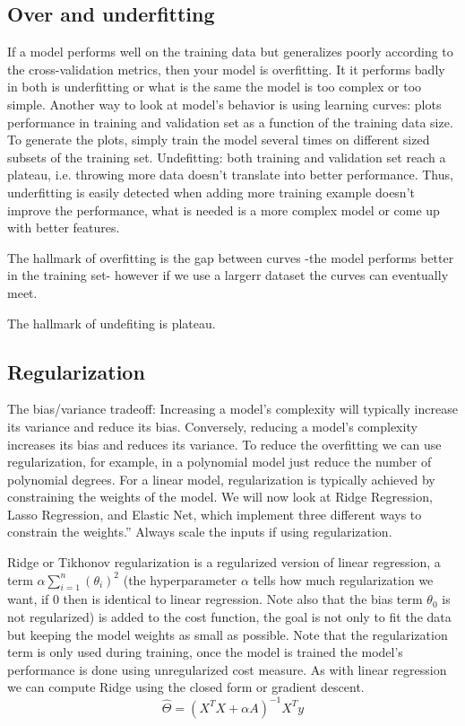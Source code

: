 \documentclass[11pt]{article}
\begin{document}
\subsection{Over and underfitting}
If a model performs well on the training data but generalizes poorly according to the cross-validation metrics, then your model is overfitting. It it performs badly in both is underfitting or what is the same the model is too complex or too simple. Another way to look at model's behavior is using learning curves: plots performance in training and validation set as a function of the training data size. To generate the plots, simply train the model several times on different sized subsets of the training set.
Undefitting: both training and validation set reach a plateau, i.e. throwing more data doesn't translate into better performance.
Thus, underfitting is easily detected when adding more training example doesn't improve the performance, what is needed is a more complex model or come up with better features.

The hallmark of overfitting is the gap between curves -the model performs better in the training set- however if we use a largerr dataset the curves can eventually meet.

The hallmark of undefiting is plateau.


\subsection{Regularization}
The bias/variance tradeoff: Increasing a model’s complexity will typically increase its variance and reduce its bias. Conversely, reducing a model’s complexity increases its bias and reduces its variance. To reduce the overfitting we can use regularization, for example, in a polynomial model just reduce the number of polynomial degrees.
For a linear model, regularization is typically achieved by constraining the weights of the model. We will now look at Ridge Regression, Lasso Regression, and Elastic Net, which implement three different ways to constrain the weights.”
Always scale the inputs if using regularization.


Ridge or Tikhonov regularization is a regularized version of linear regression, a term $\alpha \sum_{i=1}^{n}(\theta_i)^2$ (the hyperparameter $\alpha$ tells how much regularization we want, if 0 then is identical to linear regression. Note also that the bias term $\theta_0$ is not regularized) is added to the cost function, the goal is not only to fit the data but keeping the model weights as small as possible. Note that the regularization term is only used during training, once the model is trained the model's performance is done using unregularized cost measure.
As with linear regression we can compute Ridge using the closed form or gradient descent.
\begin{equation}
\hat{\Theta} = (X^{T}X + \alpha A)^{-1}X^{T}y
\end{equation}
\end{document}
